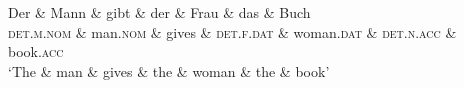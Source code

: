 \documentclass[border=8pt]{standalone}
\begin{document}
\begin{dependency}[theme=simple, label style={above, font=\small\itshape}]
  \begin{deptext}[column sep=1.2em, row sep=0.6em]
    Der \& Mann \& gibt \& der \& Frau \& das \& Buch \\
    \textsc{det.m.nom} \& man.\textsc{nom} \& gives \&
      \textsc{det.f.dat} \& woman.\textsc{dat} \&
      \textsc{det.n.acc} \& book.\textsc{acc} \\
    `The \& man \& gives \& the \& woman \& the \& book' \\
  \end{deptext}
\end{dependency}
\end{document}
